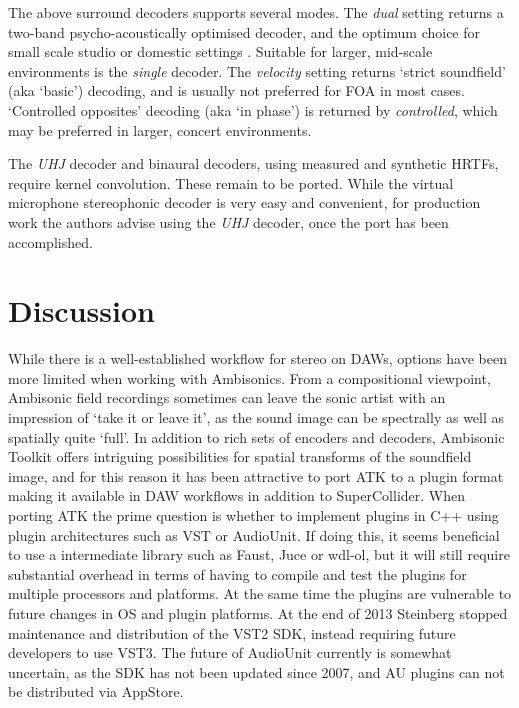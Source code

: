 \documentclass{article}
\begin{document}
The above surround decoders supports several modes. 
The \emph{dual} setting returns a two-band psycho-acoustically optimised decoder, and the optimum choice for small scale studio or domestic settings \cite{heller:2008isAmbisonic}.
Suitable for larger, mid-scale environments is the \emph{single} decoder.
The \emph{velocity} setting returns `strict soundfield' (aka `basic') decoding, and is usually not preferred for FOA in most cases.
`Controlled opposites' decoding (aka `in phase') is returned by \emph{controlled}, which may be preferred in larger, concert environments.

The \emph{UHJ} decoder and binaural decoders, using measured and synthetic HRTFs, require kernel convolution. These remain to be ported. While the virtual microphone stereophonic decoder is very easy and convenient, for production work the authors advise using the \emph{UHJ} decoder, once the port has been accomplished.







\section{Discussion}\label{sec:discussion}

While there is a well-established workflow for stereo on DAWs, options have been more limited when working with Ambisonics.
From a compositional viewpoint, Ambisonic field recordings sometimes can leave the sonic artist with an impression of `take it or leave it', as the sound image can be spectrally as well as spatially quite `full'.
In addition to rich sets of encoders and decoders, Ambisonic Toolkit offers intriguing possibilities for spatial transforms of the soundfield image, and for this reason it has been attractive to port ATK to a plugin format making it available in DAW workflows in addition to SuperCollider.
When porting ATK the prime question is whether to implement plugins in C++ using plugin architectures such as VST or AudioUnit.
If doing this, it seems beneficial to use a intermediate library such as Faust, Juce or wdl-ol, but it will still require substantial overhead in terms of having to compile and test the plugins for multiple processors and platforms.
At the same time the plugins are vulnerable to future changes in OS and plugin platforms.
At the end of 2013 Steinberg stopped maintenance and distribution of the VST2 SDK, instead requiring future developers to use VST3. The future of AudioUnit currently is somewhat uncertain, as the SDK has not been updated since 2007, and AU plugins can not be distributed via AppStore.
\end{document}
